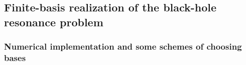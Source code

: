 \subsection{Finite-basis realization of the black-hole resonance problem}
\subsubsection{Numerical implementation and some schemes of choosing bases}
